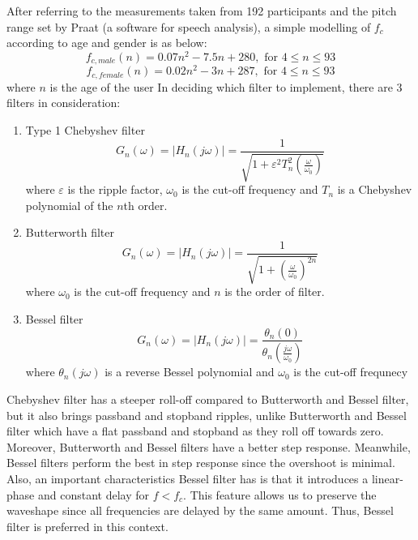 After referring to the measurements taken from 192 participants and the pitch range
set by Praat (a software for speech analysis), a simple modelling of $f_c$ according to age and gender
is as below:
\[f_{c,male}(n) = 0.07n^2 - 7.5n + 280, \text{ for } 4 \leq n\leq 93 \label{male} \] 
\[f_{c,female}(n) = 0.02n^2 - 3n + 287, \text{ for } 4 \leq n \leq 93 \label{female} \] 
where $n$ is the age of the user
In deciding which filter to implement, there are 3 filters in consideration:
\begin{enumerate}[label=(\alph*)]
	\item Type 1 Chebyshev filter
	\[G_{n}(\omega) = |H_{n}(j\omega)| = {\frac{1}{\sqrt{1+\varepsilon^{2} T_{n}^{2}(\frac{\omega}{\omega_{0}})}}}\]
	where $\varepsilon$  is the ripple factor, $\omega _{0}$ is the cut-off frequency
	and $T_{n}$ is a Chebyshev polynomial of the $n$th order.
	\item Butterworth filter
	\[G_{n}(\omega) = |H_{n}(j\omega)| = {\frac{1}{\sqrt{1+(\frac{\omega}{\omega_{0}})^{2n}}}}\]
	where $\omega _{0}$ is the cut-off frequency and $n$ is the order of filter.
	\item Bessel filter
	\[G_{n}(\omega) = |H_{n}(j\omega)| ={\frac {\theta _{n}(0)}{\theta _{n}(\frac{j\omega}{\omega _{0}})}}\]
	where $\theta _{n}(j\omega)$ is a reverse Bessel polynomial and $\omega _{0}$ is the cut-off frequnecy
\end{enumerate}

Chebyshev filter has a steeper roll-off compared to Butterworth and Bessel filter, but it also brings passband and stopband ripples, 
unlike Butterworth and Bessel filter which have a flat passband and stopband as they roll off towards zero. Moreover, Butterworth 
and Bessel filters have a better step response. Meanwhile, Bessel filters perform the best in step response since the overshoot is
minimal. Also, an important characteristics Bessel filter has is that it introduces a linear-phase and constant delay for $f<f_c$. This
feature allows us to preserve the waveshape since all frequencies are delayed by the same amount.
Thus, Bessel filter is preferred in this context.

